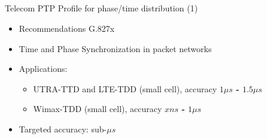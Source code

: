 \documentclass[compress,red]{beamer}
\begin{document}
\subsection{}
\begin{frame}{Telecom PTP Profile for phase/time distribution (1)}

  \begin{itemize}
    \item Recommendations G.827x
    \item Time and Phase Synchronization in packet networks
    \item Applications:
	\begin{itemize}
	  \item UTRA-TTD and LTE-TDD (small cell), accuracy {\bf $1\mu s$ - $1.5\mu s$}
	  \item Wimax-TDD (small cell), accuracy {\bf $x ns$ - $1\mu s$}
	\end{itemize}
    \item Targeted accuracy: sub-$\mu s$
  \end{itemize}


\end{frame}
\end{document}
